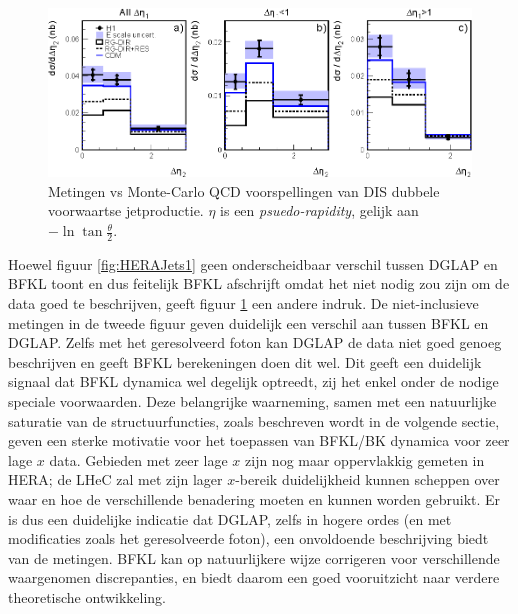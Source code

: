 \documentclass[a4paper,11pt]{article}
\numberwithin{equation}{section} %
\begin{document}
\begin{figure} [H]
  \begin{center}
    \includegraphics[scale=1]{Afbeeldingen/HERAJets2.eps}
    \caption{Metingen vs Monte-Carlo QCD voorspellingen van DIS dubbele voorwaartse jetproductie. $\eta$ is een \textit{psuedo-rapidity}, gelijk aan $-\ln{\tan{\frac{\theta}{2}}}$. \cite{Kiesling}}
   \label{fig:HERAJets2}
  \end{center}
\end{figure}
Hoewel figuur \ref{fig:HERAJets1} geen onderscheidbaar verschil tussen DGLAP en BFKL toont en dus feitelijk BFKL afschrijft omdat het niet nodig zou zijn om de data goed te beschrijven, geeft figuur \ref{fig:HERAJets2} een andere indruk.
De niet-inclusieve metingen in de tweede figuur geven duidelijk een verschil aan tussen BFKL en DGLAP.
Zelfs met het geresolveerd foton kan DGLAP de data niet goed genoeg beschrijven en geeft BFKL berekeningen doen dit wel.
Dit geeft een duidelijk signaal dat BFKL dynamica wel degelijk optreedt, zij het enkel onder de nodige speciale voorwaarden.
Deze belangrijke waarneming, samen met een natuurlijke saturatie van de structuurfuncties, zoals beschreven wordt in de volgende sectie, geven een sterke motivatie voor het toepassen van BFKL/BK dynamica voor zeer lage $x$ data.
Gebieden met zeer lage $x$ zijn nog maar oppervlakkig gemeten in HERA; de LHeC zal met zijn lager $x$-bereik duidelijkheid kunnen scheppen over waar en hoe de verschillende benadering moeten en kunnen worden gebruikt.
Er is dus een duidelijke indicatie dat DGLAP, zelfs in hogere ordes (en met modificaties zoals het geresolveerde foton), een onvoldoende beschrijving biedt van de metingen.
BFKL kan op natuurlijkere wijze corrigeren voor verschillende waargenomen discrepanties, en biedt daarom een goed vooruitzicht naar verdere theoretische ontwikkeling.
\end{document}
